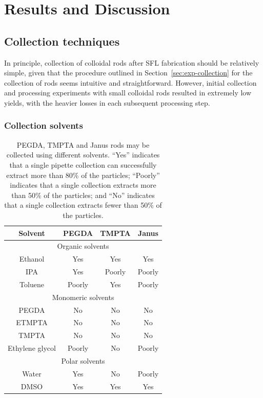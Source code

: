 \section{Results and Discussion}

\subsection{Collection techniques}
\label{sec:rod-collection}

In principle, collection of colloidal rods after SFL fabrication should be relatively simple,
given that the 
procedure outlined in Section~\ref{sec:exp-collection} for the collection of rods seems intuitive and
straightforward.  However, initial 
collection and processing experiments 
with small colloidal rods resulted in
extremely low yields, with the heavier losses in each subsequent processing step.


\subsubsection{Collection solvents}

\begin{table}[h]
\begin{center}
\begin{tabular}{| c | c | c | c |}
\hline 
Solvent & PEGDA & TMPTA & Janus \\ \hline
\multicolumn{4}{|c|}{Organic solvents} \\ \hline
Ethanol & Yes & Yes & Yes \\
IPA & Yes & Poorly & Poorly \\
Toluene & Poorly & Yes & Poorly \\
\hline
\multicolumn{4}{|c|}{Monomeric solvents} \\ \hline
PEGDA & No & No & No \\
ETMPTA & No & No & No \\
TMPTA & No & No & No \\
Ethylene glycol & Poorly & No & Poorly \\
\hline
\multicolumn{4}{|c|}{Polar solvents} \\ \hline
Water & Yes & No & Poorly \\
DMSO & Yes & Yes & Yes \\
\hline
\end{tabular}

\end{center}
\caption{PEGDA, TMPTA and Janus rods may be collected using different solvents. ``Yes'' indicates that
a single pipette collection can successfully extract more than 80\% of the particles;
``Poorly'' indicates that a single collection extracts more than 50\% of the particles; and
``No'' indicates that a single collection extracts fewer than 50\% of the particles.}
\label{tab:collect-solvent}
\end{table}

